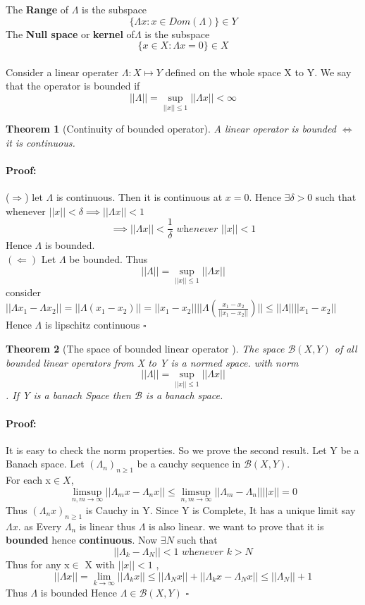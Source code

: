\documentclass{article}
\newenvironment{proof}{\paragraph{Proof:}}{\hfill$\square$}
\newtheorem{theorem}{Theorem}[section]
\begin{document}
The \textbf{Range} of $\Lambda $ is the subspace $$\{ \Lambda x: x\in Dom(\Lambda ) \} \in Y$$
The \textbf{Null space } or \textbf{kernel} of$\Lambda $ is the subspace $$\{ x \in X: \Lambda x=0\}\in X$$
\\
Consider a linear operater $\Lambda :X\mapsto Y $ defined on the whole space X to Y. We say that the operator is bounded if $$ ||\Lambda || = \sup_{||x||\leq 1} ||\Lambda x|| < \infty$$ 
\begin{theorem}[Continuity of bounded operator]
    A linear operator is bounded $\iff$ it is continuous.
    
\end{theorem}  
\begin{proof}
    ($\Rightarrow$) let $\Lambda$ is continuous. Then it is continuous at $x=0$. Hence $\exists \delta >0 $ such that whenever $||x||< \delta \implies ||\Lambda x||<1$
    $$\implies ||\Lambda x||<\frac{1}{\delta} \textit{ whenever } ||x||<1 $$
    Hence $\Lambda $ is bounded. \\
   $ (\Leftarrow )$ Let $\Lambda $ be bounded. Thus $$ ||\Lambda || = \sup_{||x||\leq 1} ||\Lambda x||$$ 
   consider $||\Lambda x_1 - \Lambda x_2||= ||\Lambda(x_1-x_2)||=||x_1-x_2||||\Lambda(\frac{x_1-x_2}{||x_1-x_2||})||\leq ||\Lambda||||x_1-x_2||$
   Hence $\Lambda$ is lipschitz continuous 
\end{proof}

\begin{theorem}[The space of bounded linear operator ]
    The space $\mathcal{B} (X,Y)$ of all bounded linear operators from X to Y is a normed space. with norm $$ ||\Lambda || = \sup_{||x||\leq 1} ||\Lambda x||$$ . If Y is a banach Space then $\mathcal{B}$ is a banach space.
\end{theorem}
\begin{proof}
    It is easy to check the norm properties.
    So we prove the second result.
    Let Y be a Banach space.
    Let $(\Lambda_n)_{n\geq 1} $ be a cauchy sequence in $\mathcal{B}(X,Y)$. \\
    For each x$\in X$, $$\limsup_{n,m\to \infty} ||\Lambda_m x -\Lambda_nx||\leq \limsup_{n,m\to \infty} ||\Lambda_m  -\Lambda_n||||x||=0 $$
    Thus $(\Lambda_n x )_{n\geq 1}$ is Cauchy in Y. Since Y is Complete, It has a unique limit say $\Lambda x.$
    as Every $\Lambda_n $ is linear thus $\Lambda $ is also linear.
    we want to prove that it is \textbf{bounded} hence \textbf{continuous}. Now $\exists N $ such that $$||\Lambda_k - \Lambda_N ||<1 \textit{ whenever } k>N$$ Thus   for any x$\in$ X with $||x||<1$ ,   $$||\Lambda x||= \lim_{k \to \infty}  ||\Lambda_k x||\leq ||\Lambda_N x|| + ||\Lambda_k x - \Lambda_N x||\leq ||\Lambda_N|| +1$$
    Thus $\Lambda$ is bounded  Hence  $\Lambda \in \mathcal{B}(X,Y) $ 
\end{proof}
\end{document}
